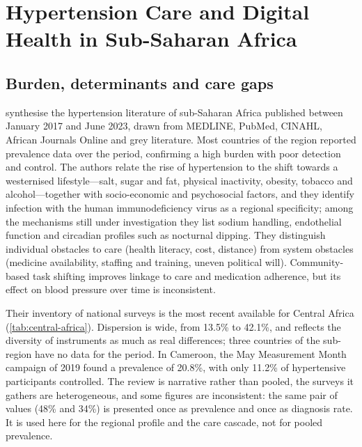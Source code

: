 \documentclass[11pt,a4paper,oneside]{report}
\begin{document}
\section{Hypertension Care and Digital Health in Sub-Saharan Africa}\label{sec:lr-regional}\label{sec:diagnosis}

\subsection{Burden, determinants and care gaps}

\Textcite{gafane2024} synthesise the hypertension literature of sub-Saharan Africa published between January 2017 and June 2023, drawn from MEDLINE, PubMed, CINAHL, African Journals Online and grey literature. Most countries of the region reported prevalence data over the period, confirming a high burden with poor detection and control. The authors relate the rise of hypertension to the shift towards a westernised lifestyle---salt, sugar and fat, physical inactivity, obesity, tobacco and alcohol---together with socio-economic and psychosocial factors, and they identify infection with the human immunodeficiency virus as a regional specificity; among the mechanisms still under investigation they list sodium handling, endothelial function and circadian profiles such as nocturnal dipping. They distinguish individual obstacles to care (health literacy, cost, distance) from system obstacles (medicine availability, staffing and training, uneven political will). Community-based task shifting improves linkage to care and medication adherence, but its effect on blood pressure over time is inconsistent.

Their inventory of national surveys is the most recent available for Central Africa (\cref{tab:central-africa}). Dispersion is wide, from 13.5\% to 42.1\%, and reflects the diversity of instruments as much as real differences; three countries of the sub-region have no data for the period. In Cameroon, the May Measurement Month campaign of 2019 found a prevalence of 20.8\%, with only 11.2\% of hypertensive participants controlled. The review is narrative rather than pooled, the surveys it gathers are heterogeneous, and some figures are inconsistent: the same pair of values (48\% and 34\%) is presented once as prevalence and once as diagnosis rate. It is used here for the regional profile and the care cascade, not for pooled prevalence.
\end{document}
